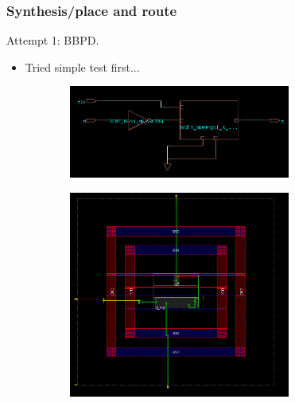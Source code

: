 \documentclass[t, screen, aspectratio=43]{beamer}
\begin{document}
\begin{frame}
	\frametitle{Synthesis/place and route}
	\begin{block}{Attempt 1: BBPD.}
	\tiny
	\begin{itemize}[itemsep=4pt,label=\protect---]
		\item Tried simple test first...

	\end{itemize}
	\begin{figure}[htb!]
	    \centering
	    \begin{subfigure}{0.5\textwidth}
	        \centering
	        \includegraphics[width=0.8\textwidth, angle=0]{bbpd_synth_schem.png}
	    \end{subfigure}%
	    \begin{subfigure}{0.5\textwidth}
	        \centering
	        \center\includegraphics[width=0.8\textwidth, angle=0]{bbpd_pnr.png}
	    \end{subfigure}
	\end{figure}

	\end{block}	
\end{frame}
\end{document}
